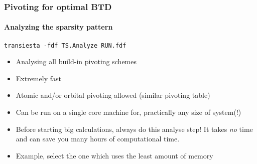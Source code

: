 \begin{frame}
  \frametitle{Pivoting for optimal BTD}
  \framesubtitle{Analyzing the sparsity pattern}

  \begin{center}
    \texttt{transiesta -fdf TS.Analyze RUN.fdf}
  \end{center}

  \begin{itemize}[<+->]
    \item Analysing all build-in pivoting schemes

    \item Extremely fast

    \item Atomic and/or orbital pivoting allowed (similar pivoting table)

    \item Can be run on a single core machine for, practically any size of system(!)

    \item Before starting big calculations, always do this analyse step! It takes
    \emph{no} time and can save you many hours of computational time.

    \item Example, select the one which uses the least amount of memory

  \end{itemize}

\end{frame}

